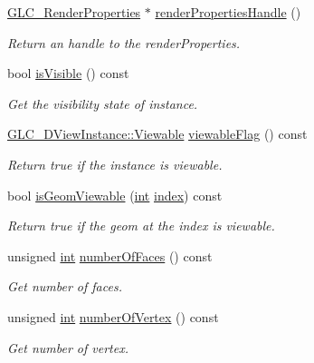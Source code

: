 \begin{DoxyCompactItemize}
\hyperlink{class_g_l_c___render_properties}{G\-L\-C\-\_\-\-Render\-Properties} $\ast$ \hyperlink{class_g_l_c__3_d_view_instance_a42a60123667c56fe3f6769d6c153be80}{render\-Properties\-Handle} ()
\begin{DoxyCompactList}\small\item\em Return an handle to the render\-Properties. \end{DoxyCompactList}\item 
bool \hyperlink{class_g_l_c__3_d_view_instance_a1bb7792acc6bc2ebac317ffbe3836454}{is\-Visible} () const 
\begin{DoxyCompactList}\small\item\em Get the visibility state of instance. \end{DoxyCompactList}\item 
\hyperlink{class_g_l_c__3_d_view_instance_a34f78b0d3fce3d0325b4538d707c5d2b}{G\-L\-C\-\_\-D\-View\-Instance\-::\-Viewable} \hyperlink{class_g_l_c__3_d_view_instance_a5e673173c77b76c48cf1d4e334b9d5e1}{viewable\-Flag} () const 
\begin{DoxyCompactList}\small\item\em Return true if the instance is viewable. \end{DoxyCompactList}\item 
bool \hyperlink{class_g_l_c__3_d_view_instance_a7a9140fdb372db194dba587e49c7f0ae}{is\-Geom\-Viewable} (\hyperlink{ioapi_8h_a787fa3cf048117ba7123753c1e74fcd6}{int} \hyperlink{glext_8h_ab47dd9958bcadea08866b42bf358e95e}{index}) const 
\begin{DoxyCompactList}\small\item\em Return true if the geom at the index is viewable. \end{DoxyCompactList}\item 
unsigned \hyperlink{ioapi_8h_a787fa3cf048117ba7123753c1e74fcd6}{int} \hyperlink{class_g_l_c__3_d_view_instance_a35a6268b96b498e3a7ce6480b1c4b677}{number\-Of\-Faces} () const 
\begin{DoxyCompactList}\small\item\em Get number of faces. \end{DoxyCompactList}\item 
unsigned \hyperlink{ioapi_8h_a787fa3cf048117ba7123753c1e74fcd6}{int} \hyperlink{class_g_l_c__3_d_view_instance_a1d7a68ed5d03002cc6917f4a717318c7}{number\-Of\-Vertex} () const 
\begin{DoxyCompactList}\small\item\em Get number of vertex. \end{DoxyCompactList}\item 

\end{DoxyCompactItemize}
